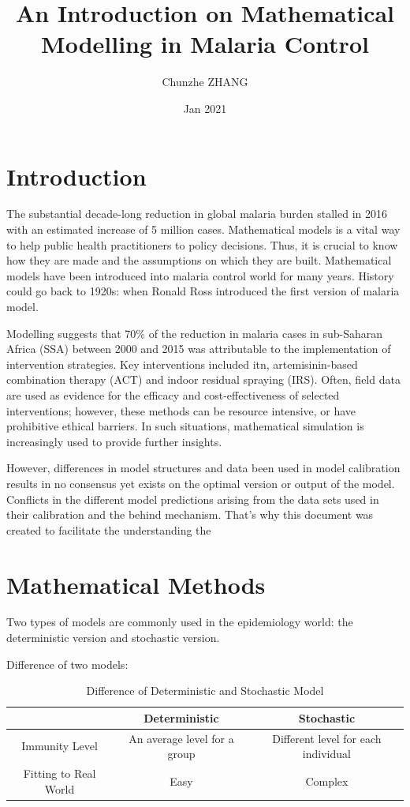 \documentclass[a4paper, 12pt, twoside]{article}
\title{An Introduction on Mathematical Modelling in Malaria Control}
\author{Chunzhe ZHANG}
\date{Jan 2021}
\begin{document}
\begin{titlepage}
	\maketitle
\end{titlepage}

\tableofcontents

\section{Introduction}
The substantial decade-long reduction in global malaria burden stalled in 2016 with an estimated increase of 5 million cases.
Mathematical models is a vital way to help public health practitioners to policy decisions.
Thus, it is crucial to know how they are made and the assumptions on which they are built.
Mathematical models have been introduced into malaria control world for many years.
History could go back to 1920s: when Ronald Ross introduced the first version of malaria model.

Modelling suggests that 70\% of the reduction in malaria cases in sub-Saharan Africa (SSA) between 2000 and 2015 was attributable to the implementation of intervention strategies.
Key interventions included \gls{itn}, artemisinin-based combination therapy (ACT) and indoor residual spraying (IRS).
Often, field data are used as evidence for the efficacy and cost-effectiveness of selected interventions; however, these methods can be resource intensive, or have prohibitive ethical barriers.
In such situations, mathematical simulation is increasingly used to provide further insights.

However, differences in model structures and data been used in model calibration results in no consensus yet exists on the optimal version or output of the model.
Conflicts in the different model predictions arising from the data sets used in their calibration and the behind mechanism.
That's why this document was created to facilitate the understanding the

\section{Mathematical Methods}

Two types of models are commonly used in the epidemiology world: the deterministic version and stochastic version.

Difference of two models:
\begin{table}[ht]
	\centering
	\label{tab:difference}
	\begin{tabular}{c c c}
		\toprule
		                      & Deterministic                & Stochastic                          \\
		\midrule
		Immunity Level        & An average level for a group & Different level for each individual \\
		Fitting to Real World & Easy                         & Complex                             \\
		\bottomrule
	\end{tabular}
	\caption{Difference of Deterministic and Stochastic Model}
\end{table}
\end{document}
